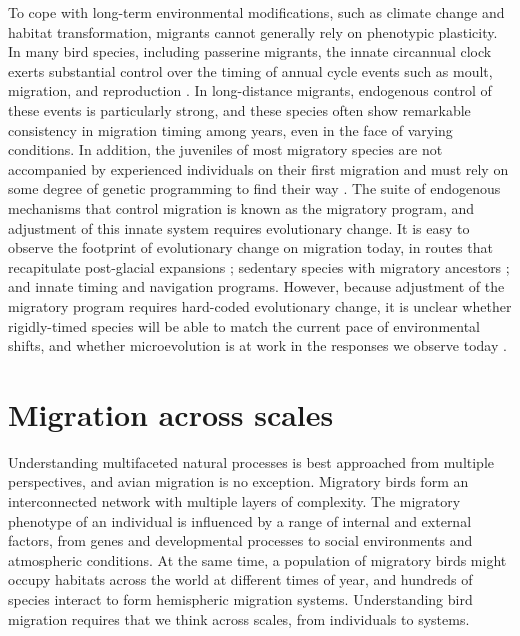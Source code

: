 \documentclass[a4paper, nobind]{templates/ociamthesis}
\begin{document}
To cope with long-term environmental modifications, such as climate change and habitat transformation, migrants cannot generally rely on phenotypic plasticity. In many bird species, including passerine migrants, the innate circannual clock exerts substantial control over the timing of annual cycle events such as moult, migration, and reproduction \autocite{gwinnerCircannualClocksAvian1996}. In long-distance migrants, endogenous control of these events is particularly strong, and these species often show remarkable consistency in migration timing among years, even in the face of varying conditions. In addition, the juveniles of most migratory species are not accompanied by experienced individuals on their first migration and must rely on some degree of genetic programming to find their way \autocite{newtonMigrationEcologyBirds2008}. The suite of endogenous mechanisms that control migration is known as the migratory program, and adjustment of this innate system requires evolutionary change. It is easy to observe the footprint of evolutionary change on migration today, in routes that recapitulate post-glacial expansions \autocite[e.g.~][]{rueggClimateChangeOrigin2006}; sedentary species with migratory ancestors \autocite[e.g.~][]{wingerAncestryEvolutionSeasonal2012}; and innate timing and navigation programs. However, because adjustment of the migratory program requires hard-coded evolutionary change, it is unclear whether rigidly-timed species will be able to match the current pace of environmental shifts, and whether microevolution is at work in the responses we observe today \autocite{gienappResponsesClimateChange2007,charmantierClimateChangeTiming2014,vanbuskirkPhenotypicPlasticityAlone2012}.

\hypertarget{migration-across-scales}{%
\section*{Migration across scales}\label{migration-across-scales}}

Understanding multifaceted natural processes is best approached from multiple perspectives, and avian migration is no exception. Migratory birds form an interconnected network with multiple layers of complexity. The migratory phenotype of an individual is influenced by a range of internal and external factors, from genes and developmental processes to social environments and atmospheric conditions. At the same time, a population of migratory birds might occupy habitats across the world at different times of year, and hundreds of species interact to form hemispheric migration systems. Understanding bird migration requires that we think across scales, from individuals to systems.
\end{document}
